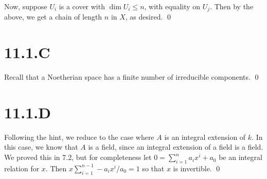 \documentclass{article}
\begin{document}
Now, suppose $U_i$ is a cover with $\dim U_i \leq n$,
with equality on $U_j$. Then by the above, we get a chain of
length $n$ in $X$, as desired. \qed

\section{11.1.C}
Recall that a Noetherian space has a finite number of irreducible components.
\qed

\section{11.1.D}
Following the hint, we reduce to the case where $A$ is an
integral extension of $k$. In this case, we know that
$A$ is a field, since an integral extension of a field is a
field. We proved this in 7.2, but for completeness let $0 = \sum_{i=1}^n a_ix^i+a_0$
be an integral relation for $x$. Then $x\sum_{i=1}^{n-1}-a_ix^i/a_0=1$
so that $x$ is invertible. \qed
\end{document}
